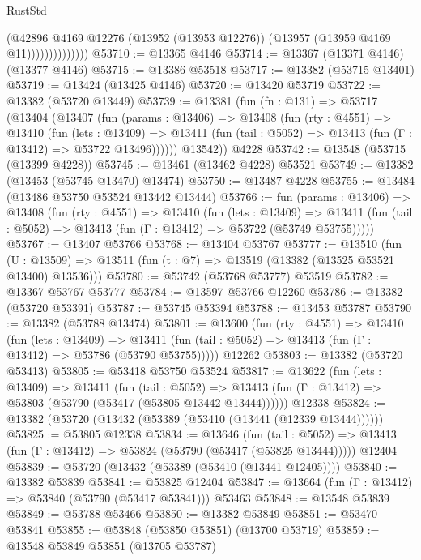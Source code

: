 \begin{lexlean}{RustStd}
\begin{coremodule}
                          (@42896
                            @4169
                            @12276
                            (@13952 (@13953 @12276))
                            (@13957 (@13959 @4169 @11))))))))))))))
@53710 := @13365 @4146
@53714 := @13367 (@13371 @4146) (@13377 @4146)
@53715 := @13386 @53518
@53717 := @13382 (@53715 @13401)
@53719 := @13424 (@13425 @4146)
@53720 := @13420 @53719
@53722 := @13382 (@53720 @13449)
@53739 := @13381
    (fun (fn : @131) =>
    @53717
      (@13404
        (@13407
          (fun (params : @13406) =>
          @13408
            (fun (rty : @4551) =>
            @13410
              (fun (lets : @13409) =>
              @13411 (fun (tail : @5052) => @13413 (fun (Γ : @13412) => @53722 @13496))))))
        @13542))
    @4228
@53742 := @13548 (@53715 (@13399 @4228))
@53745 := @13461 (@13462 @4228) @53521
@53749 := @13382 (@13453 (@53745 @13470) @13474)
@53750 := @13487 @4228
@53755 := @13484 (@13486 @53750 @53524 @13442 @13444)
@53766 := fun (params : @13406) =>
  @13408
    (fun (rty : @4551) =>
    @13410
      (fun (lets : @13409) =>
      @13411 (fun (tail : @5052) => @13413 (fun (Γ : @13412) => @53722 (@53749 @53755)))))
@53767 := @13407 @53766
@53768 := @13404 @53767
@53777 := @13510
    (fun (U : @13509) => @13511 (fun (t : @7) => @13519 (@13382 (@13525 @53521 @13400) @13536)))
@53780 := @53742 (@53768 @53777) @53519
@53782 := @13367 @53767 @53777
@53784 := @13597 @53766 @12260
@53786 := @13382 (@53720 @53391)
@53787 := @53745 @53394
@53788 := @13453 @53787
@53790 := @13382 (@53788 @13474)
@53801 := @13600
    (fun (rty : @4551) =>
    @13410
      (fun (lets : @13409) =>
      @13411 (fun (tail : @5052) => @13413 (fun (Γ : @13412) => @53786 (@53790 @53755)))))
    @12262
@53803 := @13382 (@53720 @53413)
@53805 := @53418 @53750 @53524
@53817 := @13622
    (fun (lets : @13409) =>
    @13411
      (fun (tail : @5052) =>
      @13413 (fun (Γ : @13412) => @53803 (@53790 (@53417 (@53805 @13442 @13444))))))
    @12338
@53824 := @13382 (@53720 (@13432 (@53389 (@53410 (@13441 (@12339 @13444))))))
@53825 := @53805 @12338
@53834 := @13646
    (fun (tail : @5052) => @13413 (fun (Γ : @13412) => @53824 (@53790 (@53417 (@53825 @13444)))))
    @12404
@53839 := @53720 (@13432 (@53389 (@53410 (@13441 @12405))))
@53840 := @13382 @53839
@53841 := @53825 @12404
@53847 := @13664 (fun (Γ : @13412) => @53840 (@53790 (@53417 @53841))) @53463
@53848 := @13548 @53839
@53849 := @53788 @53466
@53850 := @13382 @53849
@53851 := @53470 @53841
@53855 := @53848 (@53850 @53851) (@13700 @53719)
@53859 := @13548 @53849 @53851 (@13705 @53787)

\end{coremodule}
\end{lexlean}
